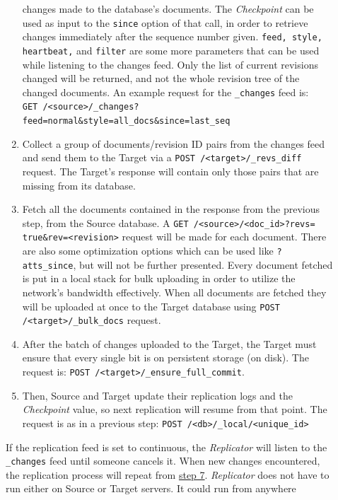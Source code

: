 \begin{description}
\begin{enumerate}
      changes made to the database's documents. The \emph{Checkpoint} can be
      used as input to the \texttt{since} option of that call, in order to
      retrieve changes immediately after the sequence number given.
      \texttt{feed, style, heartbeat,} and \texttt{filter} are some more
      parameters that can be used while listening to
      the changes feed. Only the list of current revisions changed will be
      returned, and not the whole revision tree of the changed documents. An
      example request for the \texttt{\_changes} feed is:\\\texttt{GET
      /<source>/\_changes?feed=normal\&style=all\_docs\&since=last\_seq}
      \item Collect a group of documents/revision ID pairs from the changes feed
      and send them to the Target via a \texttt{POST /<target>/\_revs\_diff}
      request. The Target's response will contain only those pairs that are
      missing from its database.
      \item Fetch all the documents contained in the response from the previous
      step, from the Source database. A \texttt{GET /<source>/<doc\_id>?revs=
      true\&rev=<revision>} request will be made for each document. There are
      also some optimization options which can be used like \texttt{?atts\_since},
      but will not be further presented. Every document fetched is put in a
      local stack for bulk uploading in order to utilize the network's bandwidth
      effectively. When all documents are fetched they will be uploaded at once
      to the Target database using \texttt{POST /<target>/\_bulk\_docs} request.
      \item After the batch of changes uploaded to the Target, the Target must
      ensure that every single bit is on persistent storage (on disk). The
      request is: \texttt{POST /<target>/\_ensure\_full\_commit}.
      \item Then, Source and Target update their replication logs and the
      \emph{Checkpoint} value, so next replication will resume from that point. The
      request is as in a previous step: \texttt{POST /<db>/\_local/<unique\_id>}
    \end{enumerate}
    If the replication feed is set to continuous, the \emph{Replicator} will
    listen to the \texttt{\_changes} feed until someone cancels it. When new
    changes encountered, the replication process will repeat from
    \underline{step 7}. \emph{Replicator} does not
    have to run either on Source or Target servers. It could run from anywhere

\end{description}
